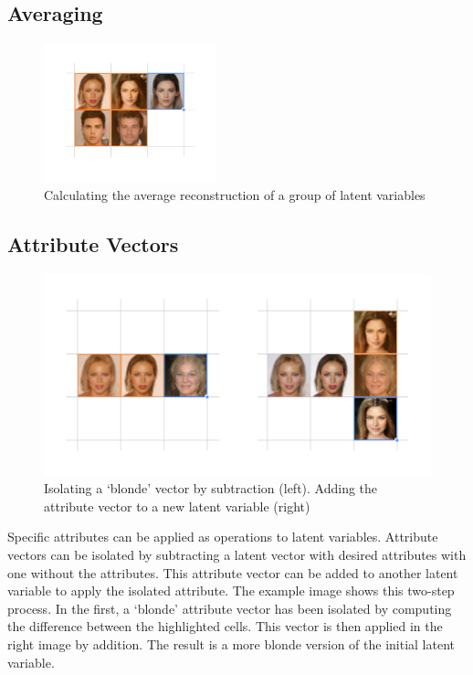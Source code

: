 \documentclass[letterpaper]{article}
\begin{document}
\subsection{Averaging}
\begin{figure}[ht!]
  \centering
  \includegraphics[width=5cm]{figs/10-averaging.jpg}
  \caption{Calculating the average reconstruction of a group of latent variables}
\end{figure}

\newpage 
\subsection{Attribute Vectors}
\begin{figure}[ht!]
  \centering
  \includegraphics[width=12cm]{figs/09-attribute-vectors.jpg}
  \caption{ Isolating a ‘blonde’ vector by subtraction (left). Adding the attribute vector to a new latent variable (right)}
\end{figure}

Specific attributes can be applied as operations to latent variables. Attribute vectors can be isolated by subtracting a latent vector with desired attributes with one without the attributes. This attribute vector can be added to another latent variable to apply the isolated attribute. The example image shows this two-step process. In the first, a ‘blonde’ attribute vector has been isolated by computing the difference between the highlighted cells. This vector is then applied in the right image by addition. The result is a more blonde version of the initial latent variable.
\end{document}
